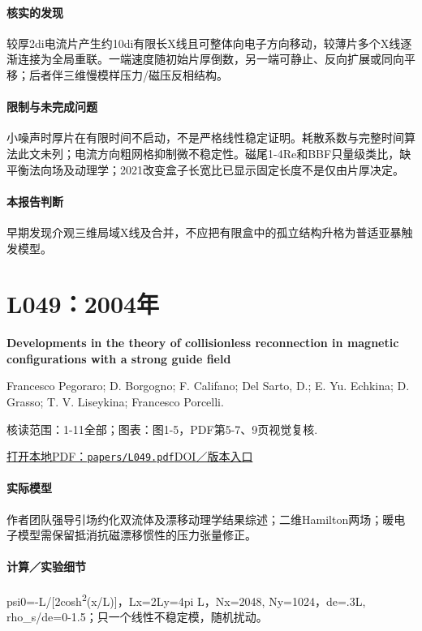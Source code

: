 \paragraph{核实的发现}较厚2di电流片产生约10di有限长X线且可整体向电子方向移动，较薄片多个X线逐渐连接为全局重联。一端速度随初始片厚倒数，另一端可静止、反向扩展或同向平移；后者伴三维慢模样压力/磁压反相结构。

\paragraph{限制与未完成问题}小噪声时厚片在有限时间不启动，不是严格线性稳定证明。耗散系数与完整时间算法此文未列；电流方向粗网格抑制微不稳定性。磁尾1-4Re和BBF只量级类比，缺平衡法向场及动理学；2021改变盒子长宽比已显示固定长度不是仅由片厚决定。

\paragraph{本报告判断}早期发现介观三维局域X线及合并，不应把有限盒中的孤立结构升格为普适亚暴触发模型。

\section{L049：2004年}\label{paper:L049}

\textbf{Developments in the theory of collisionless reconnection in magnetic configurations with a strong guide field}\citep{L049}\

Francesco Pegoraro;  D. Borgogno;  F. Califano;  Del Sarto,  D.;  E. Yu. Echkina;  D. Grasso;  T. V. Liseykina;  Francesco Porcelli.

\textsf{核读范围：}1-11全部；\textsf{图表：}图1-5，PDF第5-7、9页视觉复核.

\href{run:papers/L049.pdf}{打开本地PDF：\texttt{papers/L049.pdf}}\quad\href{https://doi.org/10.5194/npg-11-567-2004}{DOI／版本入口}

\paragraph{实际模型}作者团队强导引场约化双流体及漂移动理学结果综述；二维Hamilton两场；暖电子模型需保留抵消抗磁漂移惯性的压力张量修正。

\paragraph{计算／实验细节}psi0=-L/[2cosh\textsuperscript{2}(x/L)]，Lx=2Ly=4pi L，Nx=2048, Ny=1024，de=.3L, rho\_s/de=0-1.5；只一个线性不稳定模，随机扰动。

